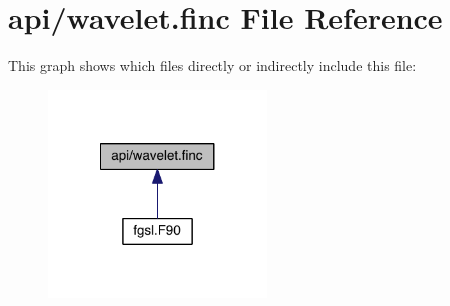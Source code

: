 \hypertarget{wavelet_8finc}{\section{api/wavelet.finc File Reference}
\label{wavelet_8finc}
}
This graph shows which files directly or indirectly include this file\-:\nopagebreak
\begin{figure}[H]
\begin{center}
\leavevmode
\includegraphics[width=164pt]{wavelet_8finc__dep__incl}
\end{center}
\end{figure}
